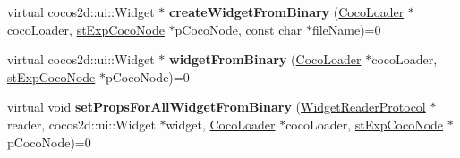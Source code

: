 \begin{DoxyCompactItemize}
virtual cocos2d\+::ui\+::\+Widget $\ast$ {\bfseries create\+Widget\+From\+Binary} (\hyperlink{classcocostudio_1_1CocoLoader}{Coco\+Loader} $\ast$coco\+Loader, \hyperlink{structcocostudio_1_1stExpCocoNode}{st\+Exp\+Coco\+Node} $\ast$p\+Coco\+Node, const char $\ast$file\+Name)=0
\item 
\mbox{\label{classcocostudio_1_1WidgetPropertiesReader_a48c24840cc7f9a48d1b0fa108f6d42b5}} 
virtual cocos2d\+::ui\+::\+Widget $\ast$ {\bfseries widget\+From\+Binary} (\hyperlink{classcocostudio_1_1CocoLoader}{Coco\+Loader} $\ast$coco\+Loader, \hyperlink{structcocostudio_1_1stExpCocoNode}{st\+Exp\+Coco\+Node} $\ast$p\+Coco\+Node)=0
\item 
\mbox{\label{classcocostudio_1_1WidgetPropertiesReader_a8d58afcf270efb06e7045e48a86ec31a}} 
virtual void {\bfseries set\+Props\+For\+All\+Widget\+From\+Binary} (\hyperlink{classcocostudio_1_1WidgetReaderProtocol}{Widget\+Reader\+Protocol} $\ast$reader, cocos2d\+::ui\+::\+Widget $\ast$widget, \hyperlink{classcocostudio_1_1CocoLoader}{Coco\+Loader} $\ast$coco\+Loader, \hyperlink{structcocostudio_1_1stExpCocoNode}{st\+Exp\+Coco\+Node} $\ast$p\+Coco\+Node)=0
\end{DoxyCompactItemize}
